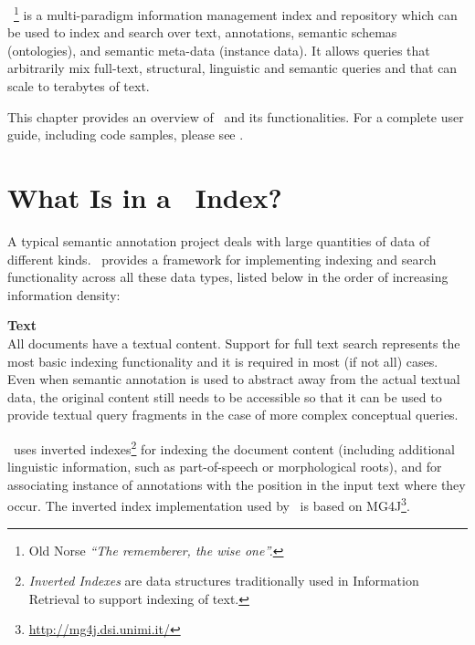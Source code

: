 
\nnormalsize



\Mimir\ \footnote{Old Norse \textit{``The rememberer, the wise one''.}} 
is a multi-paradigm information management index and repository which
can be used to index and search over text, annotations, semantic schemas
(ontologies), and semantic meta-data (instance data). It allows queries that
arbitrarily mix full-text, structural, linguistic and semantic queries and that
can scale to terabytes of text.

\ifprintedbook
This chapter provides an overview of \Mimir\ and its functionalities. For a 
complete user guide, including code samples, please see 
.

\section{What Is in a \Mimir\ Index?}

A typical semantic annotation project deals with large quantities of data of
different kinds. \Mimir\ provides a framework for implementing indexing and
search functionality across all these data types, listed below in the order of
increasing information density:

{\bf Text}\\
All documents have a textual content. Support for full text search represents
the most basic indexing functionality and it is required in most (if not all)
cases.  Even when semantic annotation is used to abstract away from the
actual textual data, the original content still needs to be accessible so
that it can be used to provide textual query fragments in the case of more
complex conceptual queries.

\Mimir\ uses inverted indexes\footnote{{\em Inverted Indexes} are data
structures traditionally used in Information Retrieval to support indexing of
text.} for indexing the document content (including additional linguistic
information, such as part-of-speech or morphological roots), and for
associating instance of annotations with the position in the input text where
they occur. The inverted index implementation used by \Mimir\ is based on
MG4J\footnote{\url{http://mg4j.dsi.unimi.it/}}.

